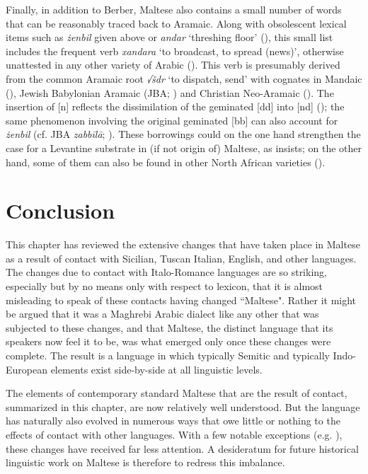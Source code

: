 \documentclass[output=paper]{langsci/langscibook}
\begin{document}
Finally, in addition to Berber, Maltese also contains a small number of words that can be reasonably traced back to Aramaic. Along with obsolescent lexical items such as \textit{żenbil} given above or \textit{andar} `threshing floor' (\citealt[116--117]{Behnstedt2005}), this small list includes the frequent verb \textit{xandara} `to broadcast, to spread (news)', otherwise unattested in any other variety of Arabic (\citealt[46]{Borg1996}). This verb is presumably derived from the common Aramaic root \textit{√šdr} `to dispatch, send' with cognates in Mandaic (\citealt[450]{manddic1963}), Jewish Babylonian Aramaic (JBA; \citealt[1112-1113]{sokoloff2002}) and Christian Neo-Aramaic (\citealt[1179]{Khan2008}). The insertion of [n] reflects the dissimilation of the geminated [dd] into [nd] (\citealt[175--176]{Lipinski1997}); the same phenomenon involving the original geminated [bb] can also account for \textit{żenbil} (cf. JBA \textit{zabbīlā}; \citealt[397]{sokoloff2002}). These borrowings could on the one hand strengthen the case for a Levantine substrate in (if not origin of) Maltese, as \cite{Borg1996} insists; on the other hand, some of them can also be found in other North African varieties (\citealt{Behnstedt2005}).

\section{Conclusion}
This chapter has reviewed the extensive changes that have taken place in Maltese as a result of contact with Sicilian, Tuscan Italian, English, and other languages. The changes due to contact with Italo-Romance languages are so striking, especially but by no means only with respect to lexicon, that it is almost misleading to speak of these contacts having changed ``Maltese". Rather it might be argued that it was a Maghrebi Arabic dialect like any other that was subjected to these changes, and that Maltese, the distinct language that its speakers now feel it to be, was what emerged only once these changes were complete. The result is a language in which typically Semitic and typically Indo-European elements exist side-by-side at all linguistic levels.

The elements of contemporary standard Maltese that are the result of contact, summarized in this chapter, are now relatively well understood. But the language has naturally also evolved in numerous ways that owe little or nothing to the effects of contact with other languages. With a few notable exceptions (e.g. \citealt{Borg1978,Vanhove1993}), these changes have received far less attention. A desideratum for future historical linguistic work on Maltese is therefore to redress this imbalance.
\end{document}

